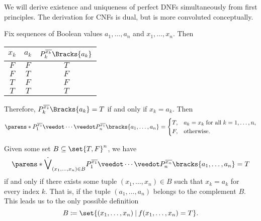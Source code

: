 \begin{defproof}
  We will derive existence and uniqueness of perfect DNFs simultaneously from first principles. The derivation for CNFs is dual, but is more convoluted conceptually.

  Fix sequences of Boolean values \( a_1, \ldots, a_n \) and \( x_1, \ldots, x_n \). Then
  \begin{center}
    \begin{tabular}{c c | c}
      \( x_k \) & \( a_k \) & \( P_k^{\overline{x_k}}\Bracks{a_k} \) \\
      \hline
      \( F \)   & \( F \)   & \( T \) \\
      \( F \)   & \( T \)   & \( F \) \\
      \( T \)   & \( F \)   & \( F \) \\
      \( T \)   & \( T \)   & \( T \)
    \end{tabular}
  \end{center}

  Therefore, \( P_k^{\overline{x_1}}\Bracks{a_k} = T \) if and only if \( x_k = a_k \). Then
  \begin{equation*}
    \parens*{ P_1^{\overline{x_1}} \synvee \cdots \synvee P_n^{\overline{x_1}} }\bracks{ a_1, \ldots, a_n }
    =
    \begin{cases}
      T, &a_k = x_k \T{for all} k = 1, \ldots, n, \\
      F, &\T{otherwise.}
    \end{cases}
  \end{equation*}

  Given some set \( B \subseteq \set{ T, F }^n \), we have
  \begin{equation*}
    \parens*{ \dot\bigvee_{(x_1, \ldots, x_n) \in B} P_1^{\overline{x_1}} \synvee \cdots \synvee P_n^{\overline{x_n}} }\bracks{ a_1, \ldots, a_n } = T
  \end{equation*}
  if and only if there exists some tuple \( (x_1, \ldots, x_n) \in B \) such that \( x_k = a_k \) for every index \( k \). That is, if the tuple \( (a_1, \ldots, a_n) \) belongs to the complement \( B \). This leads us to the only possible definition
  \begin{equation*}
    B \coloneqq \set{ (x_1, \ldots, x_n) \given f(x_1, \ldots, x_n) = T }.
  \end{equation*}
\end{defproof}

